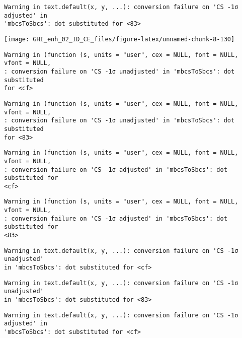 \documentclass[
  10pt,
  a4paper,oneside]{article}
\begin{document}
\begin{verbatim}
Warning in text.default(x, y, ...): conversion failure on 'CS -1σ adjusted' in
'mbcsToSbcs': dot substituted for <83>
\end{verbatim}

\begin{center}\texttt{[image: GHI\_enh\_02\_ID\_CE\_files/figure-latex/unnamed-chunk-8-130]} \end{center}

\begin{verbatim}
Warning in (function (s, units = "user", cex = NULL, font = NULL, vfont = NULL,
: conversion failure on 'CS -1σ unadjusted' in 'mbcsToSbcs': dot substituted
for <cf>
\end{verbatim}

\begin{verbatim}
Warning in (function (s, units = "user", cex = NULL, font = NULL, vfont = NULL,
: conversion failure on 'CS -1σ unadjusted' in 'mbcsToSbcs': dot substituted
for <83>
\end{verbatim}

\begin{verbatim}
Warning in (function (s, units = "user", cex = NULL, font = NULL, vfont = NULL,
: conversion failure on 'CS -1σ adjusted' in 'mbcsToSbcs': dot substituted for
<cf>
\end{verbatim}

\begin{verbatim}
Warning in (function (s, units = "user", cex = NULL, font = NULL, vfont = NULL,
: conversion failure on 'CS -1σ adjusted' in 'mbcsToSbcs': dot substituted for
<83>
\end{verbatim}

\begin{verbatim}
Warning in text.default(x, y, ...): conversion failure on 'CS -1σ unadjusted'
in 'mbcsToSbcs': dot substituted for <cf>
\end{verbatim}

\begin{verbatim}
Warning in text.default(x, y, ...): conversion failure on 'CS -1σ unadjusted'
in 'mbcsToSbcs': dot substituted for <83>
\end{verbatim}

\begin{verbatim}
Warning in text.default(x, y, ...): conversion failure on 'CS -1σ adjusted' in
'mbcsToSbcs': dot substituted for <cf>
\end{verbatim}
\end{document}
